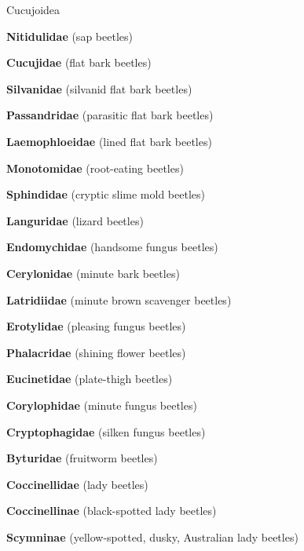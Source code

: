 \documentclass[letterpaper,10pt]{article}
\begin{document}
{\makebox[0.40cm]{}  Cucujoidea \par
\makebox[0.6cm]{}  \textbf{Nitidulidae} (sap beetles) \par
\makebox[0.6cm]{}  \textbf{Cucujidae} (flat bark beetles) \par
\makebox[0.6cm]{}  \textbf{Silvanidae} (silvanid flat bark beetles) \par
\makebox[0.6cm]{}  \textbf{Passandridae} (parasitic flat bark beetles) \par
\makebox[0.6cm]{}  \textbf{Laemophloeidae} (lined flat bark beetles) \par
\makebox[0.6cm]{}  \textbf{Monotomidae} (root-eating beetles) \par
\makebox[0.6cm]{}  \textbf{Sphindidae} (cryptic slime mold beetles) \par
\makebox[0.6cm]{}  \textbf{Languridae} (lizard beetles) \par
\makebox[0.6cm]{}  \textbf{Endomychidae} (handsome fungus beetles) \par
\makebox[0.6cm]{}  \textbf{Cerylonidae} (minute bark beetles) \par
\makebox[0.6cm]{}  \textbf{Latridiidae} (minute brown scavenger beetles) \par
\makebox[0.6cm]{}  \textbf{Erotylidae} (pleasing fungus beetles) \par
\makebox[0.6cm]{}  \textbf{Phalacridae} (shining flower beetles) \par
\makebox[0.6cm]{}  \textbf{Eucinetidae} (plate-thigh beetles) \par
\makebox[0.6cm]{}  \textbf{Corylophidae} (minute fungus beetles) \par
\makebox[0.6cm]{}  \textbf{Cryptophagidae} (silken fungus beetles) \par
\makebox[0.6cm]{}  \textbf{Byturidae} (fruitworm beetles) \par
\makebox[0.6cm]{}  \textbf{Coccinellidae} (lady beetles) \par
\makebox[0.8cm]{}  \textbf{Coccinellinae} (black-spotted lady beetles) \par
\makebox[0.8cm]{}  \textbf{Scymninae} (yellow-spotted, dusky, Australian lady beetles) \par
}
\end{document}
